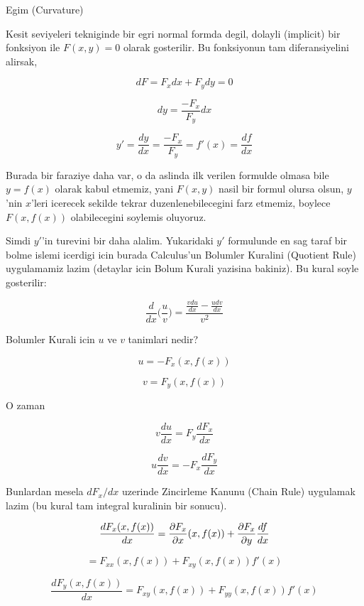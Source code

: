 \documentclass[12pt,fleqn]{article}\usepackage{../common}
\begin{document}
Egim (Curvature)

Kesit seviyeleri tekniginde bir egri normal formda degil, dolayli (implicit) bir
fonksiyon ile $F(x,y) = 0$ olarak gosterilir. Bu fonksiyonun tam diferansiyelini
alirsak,

\[ dF = F_x dx + F_y dy = 0  \]

\[ dy = \frac{-F_x}{F_y}dx  \]

\[ y' = \frac{dy}{dx} = \frac{-F_x}{F_y} = f'(x) = \frac{df}{dx} \]

Burada bir faraziye daha var, o da aslinda ilk verilen formulde olmasa bile
$y=f(x)$ olarak kabul etmemiz, yani $F(x,y)$ nasil bir formul olursa olsun,
$y$'nin $x$'leri icerecek sekilde tekrar duzenlenebilecegini farz etmemiz,
boylece $F(x,f(x))$ olabilecegini soylemis oluyoruz.

Simdi $y'$'in turevini bir daha alalim. Yukaridaki $y'$ formulunde en sag
taraf bir bolme islemi icerdigi icin burada Calculus'un Bolumler Kuralini
(Quotient Rule) uygulamamiz lazim (detaylar icin Bolum Kurali yazisina
bakiniz). Bu kural soyle gosterilir:

\[ \frac{d}{dx}\bigg(\frac{u}{v}\bigg) = 
\frac{\displaystyle \frac{v du}{dx} - \frac{u dv}{dx}}{v^2} \]

Bolumler Kurali icin $u$ ve $v$ tanimlari nedir? 

\[ u = -F_x(x,f(x))  \]

\[ v = F_y(x,f(x)) \]

O zaman

\begin{equation} v \frac{du}{dx} = F_y \frac{dF_x}{dx} \label{eq1} \end{equation}

\begin{equation} u \frac{dv}{dx} = -F_x \frac{dF_y }{dx} \label{eq2} \end{equation}

Bunlardan mesela $dF_x/dx$ uzerinde Zincirleme Kanunu (Chain Rule) uygulamak
lazim (bu kural tam integral kuralinin bir sonucu). 

\[ \frac{d F_x(x,f(x)) }{dx} = \frac{\partial F_x}{\partial  x}(x,f(x))+\frac{\partial F_x}{\partial y}\frac{df}{dx}\\ \]

\begin{equation} = F_{xx}(x,f(x))+F_{xy}(x,f(x))f'(x) \label{eq3}  \end{equation}

\begin{equation} \frac{d F_y(x,f(x)) }{dx} =  F_{xy}(x,f(x))+F_{yy}(x,f(x))f'(x) \label{eq4} \end{equation}
\end{document}
